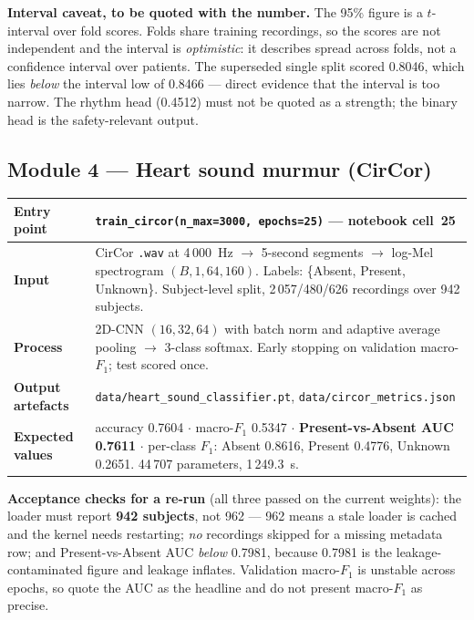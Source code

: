 \documentclass[11pt,a4paper]{article}
\newcommand{\code}[1]{\texttt{\small #1}}
\begin{document}
\begin{notebox}
\textbf{Interval caveat, to be quoted with the number.} The 95\% figure is
a $t$-interval over fold scores. Folds share training recordings, so the
scores are not independent and the interval is \emph{optimistic}: it
describes spread across folds, not a confidence interval over patients.
The superseded single split scored 0.8046, which lies \emph{below} the
interval low of 0.8466 --- direct evidence that the interval is too
narrow. The rhythm head (0.4512) must not be quoted as a strength; the
binary head is the safety-relevant output.
\end{notebox}

\subsection{Module 4 --- Heart sound murmur (CirCor)}

\begin{table}[!ht]
\centering
\small
\begin{tabular}{@{}p{2.4cm}p{12.4cm}@{}}
\toprule
\textbf{Entry point} & \code{train\_circor(n\_max=3000, epochs=25)} ---
notebook cell~25\\
\midrule
\textbf{Input} & CirCor \code{.wav} at 4\,000~Hz $\rightarrow$ 5-second
segments $\rightarrow$ log-Mel spectrogram $(B, 1, 64, 160)$. Labels:
\{Absent, Present, Unknown\}. Subject-level split,
2\,057/480/626 recordings over 942 subjects.\\
\addlinespace
\textbf{Process} & 2D-CNN $(16,32,64)$ with batch norm and adaptive
average pooling $\rightarrow$ 3-class softmax. Early stopping on
validation macro-$F_1$; test scored once.\\
\addlinespace
\textbf{Output artefacts} & \code{data/heart\_sound\_classifier.pt},
\code{data/circor\_metrics.json}\\
\addlinespace
\textbf{Expected values} & accuracy 0.7604 $\cdot$ macro-$F_1$ 0.5347
$\cdot$ \textbf{Present-vs-Absent AUC 0.7611} $\cdot$ per-class $F_1$:
Absent 0.8616, Present 0.4776, Unknown 0.2651. 44\,707 parameters,
1\,249.3~s.\\
\bottomrule
\end{tabular}
\end{table}

\noindent
\textbf{Acceptance checks for a re-run} (all three passed on the current
weights): the loader must report \textbf{942 subjects}, not 962 --- 962
means a stale loader is cached and the kernel needs restarting; \emph{no}
recordings skipped for a missing metadata row; and Present-vs-Absent AUC
\emph{below} 0.7981, because 0.7981 is the leakage-contaminated figure and
leakage inflates. Validation macro-$F_1$ is unstable across epochs, so
quote the AUC as the headline and do not present macro-$F_1$ as precise.
\end{document}
